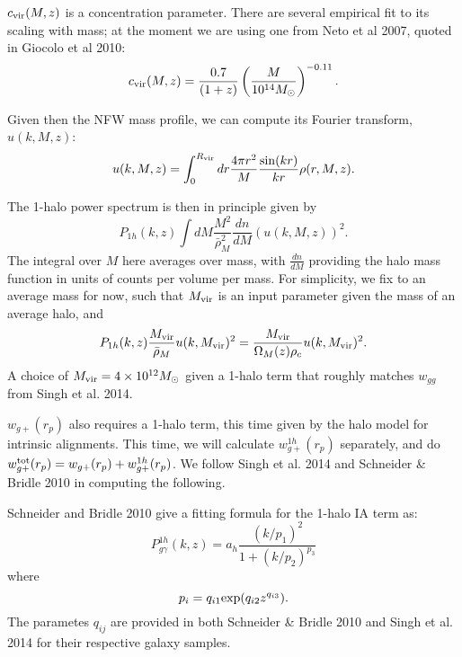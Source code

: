 \documentclass[onecolumn,amsmath,aps,fleqn, superscriptaddress]{revtex4}
\begin{document}
$c_{\rm vir}(M,z)$ is a concentration parameter. There are several empirical fit to its scaling with mass; at the moment we are using one from Neto et al 2007, quoted in Giocolo et al 2010:
\begin{equation}
c_{\rm vir}(M,z) = \frac{0.7}{(1+z)}\left(\frac{M}{10^{14}M_{\odot}}\right)^{-0.11}.
\label{cvir}
\end{equation}

Given then the NFW mass profile, we can compute its Fourier transform, $u(k, M, z)$:
\begin{equation}
u(k, M, z) = \int_0^{R_{\rm vir}} dr \frac{4 \pi r^2}{M}\frac{\sin(kr)}{kr}\rho(r, M, z).
\label{u}
\end{equation}

The 1-halo power spectrum is then in principle given by
\begin{equation}
P_{1h}(k,z) \int dM \frac{M^2}{\bar{\rho}_M^2} \frac{dn}{dM} (u(k, M, z))^2.
\label{P1h_dndm}
\end{equation}
The integral over $M$ here averages over mass, with $\frac{dn}{dM}$ providing the halo mass function in units of counts per volume per mass. For simplicity, we fix to an average mass for now, such that $M_{\rm vir}$ is an input parameter given the mass of an average halo, and 
\begin{equation}
P_{1h}(k,z) \frac{M_{\rm vir}}{\bar{\rho}_M} u(k,M_{\rm vir})^2 = \frac{M_{\rm vir}}{\Omega_M(z) \rho_c} u(k,M_{\rm vir})^2.
\label{P1h_onemass}
\end{equation}
A choice of $M_{\rm vir} = 4 \times 10^{12} M_{\odot}$ given a 1-halo term that roughly matches $w_{gg}$ from Singh et al. 2014.

$w_{g+}(r_p)$ also requires a 1-halo term, this time given by the halo model for intrinsic alignments. This time, we will calculate $w_{g+}^{1h}(r_p)$ separately, and do $w_{g+}^{\rm tot}(r_p) = w_{g+}(r_p) + w_{g+}^{1h}(r_p)$. We follow Singh et al. 2014 and Schneider \& Bridle 2010 in computing the following.

Schneider and Bridle 2010 give a fitting formula for the 1-halo IA term as:
\begin{equation}
P^{1h}_{g\gamma}(k,z) = a_h \frac{(k/p_1)^2}{1+ (k/p_2)^{p_3}}
\label{P1hIA}
\end{equation}
where
\begin{equation}
p_i = q_{i1} {\rm exp}(q_{i2} z^{q_{i3}}).
\label{pi}
\end{equation}
The parametes $q_{ij}$ are provided in both Schneider \& Bridle 2010 and Singh et al. 2014 for their respective galaxy samples.
\end{document}
